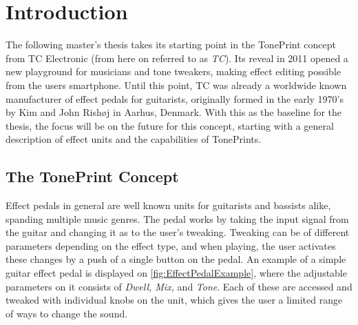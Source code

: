 \chapter{Introduction}
\label{Introduction}
The following master's thesis takes its starting point in the TonePrint concept from TC Electronic (from here on referred to as \textit{TC}). Its reveal in 2011 opened a new playground for musicians and tone tweakers, making effect editing possible from the users smartphone. Until this point, TC was already a worldwide known manufacturer of effect pedals for guitarists, originally formed in the early 1970's by Kim and John Rishøj in Aarhus, Denmark. With this as the baseline for the thesis, the focus will be on the future for this concept, starting with a general description of effect units and the capabilities of TonePrints.

\section{The TonePrint Concept}
\label{TonePrints}
Effect pedals in general are well known units for guitarists and bassists alike, spanding multiple music genres. The pedal works by taking the input signal from the guitar and changing it as to the user's tweaking. Tweaking can be of different parameters depending on the effect type, and when playing, the user activates these changes by a push of a single button on the pedal. An example of a simple guitar effect pedal is displayed on \autoref{fig:EffectPedalExample}, where the adjustable parameters on it consists of \textit{Dwell, Mix,} and \textit{Tone}. Each of these are accessed and tweaked with individual knobs on the unit, which gives the user a limited range of ways to change the sound.

